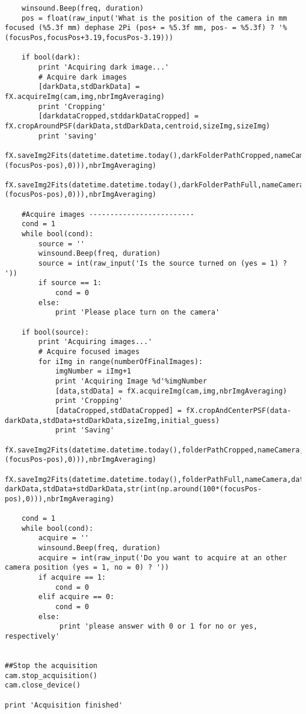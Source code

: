 \begin{lstlisting}
    winsound.Beep(freq, duration)
    pos = float(raw_input('What is the position of the camera in mm focused (%5.3f mm) dephase 2Pi (pos+ = %5.3f mm, pos- = %5.3f) ? '%(focusPos,focusPos+3.19,focusPos-3.19)))

    if bool(dark):
        print 'Acquiring dark image...'
        # Acquire dark images
        [darkData,stdDarkData] = fX.acquireImg(cam,img,nbrImgAveraging)
        print 'Cropping'
        [darkdataCropped,stddarkDataCropped] = fX.cropAroundPSF(darkData,stdDarkData,centroid,sizeImg,sizeImg)
        print 'saving'        
        fX.saveImg2Fits(datetime.datetime.today(),darkFolderPathCropped,nameCamera,darkdataCropped,stddarkDataCropped,str(int(np.around(100*(focusPos-pos),0))),nbrImgAveraging)
        fX.saveImg2Fits(datetime.datetime.today(),darkFolderPathFull,nameCamera,darkData,stdDarkData,str(int(np.around(100*(focusPos-pos),0))),nbrImgAveraging)

    #Acquire images -------------------------
    cond = 1
    while bool(cond):
        source = ''
        winsound.Beep(freq, duration)
        source = int(raw_input('Is the source turned on (yes = 1) ? '))
        if source == 1:
            cond = 0
        else:
            print 'Please place turn on the camera'

    if bool(source):
        print 'Acquiring images...'
        # Acquire focused images
        for iImg in range(numberOfFinalImages):
            imgNumber = iImg+1
            print 'Acquiring Image %d'%imgNumber
            [data,stdData] = fX.acquireImg(cam,img,nbrImgAveraging)
            print 'Cropping'
            [dataCropped,stdDataCropped] = fX.cropAndCenterPSF(data-darkData,stdData+stdDarkData,sizeImg,initial_guess)
            print 'Saving'
            fX.saveImg2Fits(datetime.datetime.today(),folderPathCropped,nameCamera,dataCropped,stdDataCropped,str(int(np.around(100*(focusPos-pos),0))),nbrImgAveraging)
            fX.saveImg2Fits(datetime.datetime.today(),folderPathFull,nameCamera,data-darkData,stdData+stdDarkData,str(int(np.around(100*(focusPos-pos),0))),nbrImgAveraging)

    cond = 1
    while bool(cond):
        acquire = ''
        winsound.Beep(freq, duration)
        acquire = int(raw_input('Do you want to acquire at an other camera position (yes = 1, no = 0) ? '))
        if acquire == 1:
            cond = 0
        elif acquire == 0:
            cond = 0
        else:
             print 'please answer with 0 or 1 for no or yes, respectively'


##Stop the acquisition
cam.stop_acquisition()
cam.close_device()

print 'Acquisition finished'

\end{lstlisting}
